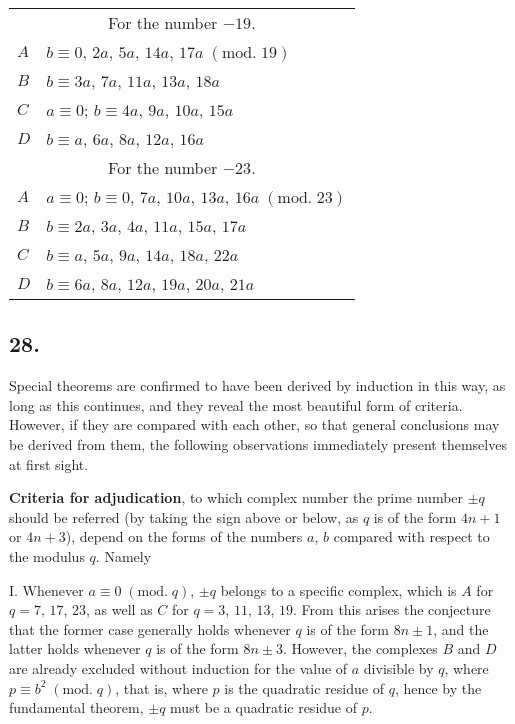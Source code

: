 \documentclass[twoside,12pt, showframe]{memoir}
\renewcommand{\pmod}[1]{\;(\textrm{mod.}\;#1)}
\begin{document}
\begin{center}
\begin{tabular}{l|l}
\multicolumn{2}{c}{For the number \(-19\).}\\
\(A\) & \(b \equiv 0\), \(2 a\), \(5 a\), \(14 a\), \(17 a\pmod{19} \)\\
\(B\) & \(b \equiv 3 a\), \(7 a\), \(11 a\), \(13 a\), \(18 a \)\\
\(C\) & \(a \equiv 0\); \(b \equiv 4 a\), \(9 a\), \(10 a\), \(15 a \)\\
\(D\) & \(b \equiv a\), \(6 a\), \(8 a\), \(12 a\), \(16 a\)\\
\multicolumn{2}{c}{For the number \(-23\).}\\
\(A\) & \(a \equiv 0\); \(b \equiv 0\), \(7 a\), \(10 a\), \(13 a\), \(16 a\pmod{23} \)\\
\(B\) & \(b \equiv 2 a\), \(3 a\), \(4 a\), \(11 a\), \(15 a\), \(17 a \)\\
\(C\) & \(b \equiv a\), \(5 a\), \(9 a\), \(14 a\), \(18 a\), \(22 a \)\\
\(D\) & \(b \equiv 6 a\), \(8 a\), \(12 a\), \(19 a\), \(20 a\), \(21 a\)
\end{tabular}
\end{center}
%

\subsection*{28.}

Special theorems are confirmed to have been derived by induction in this way, as long as this continues, and they reveal the most beautiful form of criteria. However, if they are compared with each other, so that general conclusions may be derived from them, the following observations immediately present themselves at first sight.
%

\textbf{Criteria for adjudication}, to which complex number the prime number \(\pm q\) should be referred (by taking the sign above or below, as \(q\) is of the form \(4n+1\) or \(4n+3\)), depend on the forms of the numbers \(a\), \(b\) compared with respect to the modulus \(q\). Namely

I. Whenever \(a \equiv 0\pmod{q}\), \(\pm q\) belongs to a specific complex, which is \(A\) for \(q=7\), \(17\), \(23\), as well as \(C\) for \(q=3\), \(11\), \(13\), \(19\). From this arises the conjecture that the former case generally holds whenever \(q\) is of the form \(8n\pm1\), and the latter holds whenever \(q\) is of the form \(8n\pm3\). However, the complexes \(B\) and \(D\) are already excluded without induction for the value of \(a\) divisible by \(q\), where \(p \equiv b^2\pmod{q}\), that is, where \(p\) is the quadratic residue of \(q\), hence by the fundamental theorem, \(\pm q\) must be a quadratic residue of \(p\).
\end{document}
